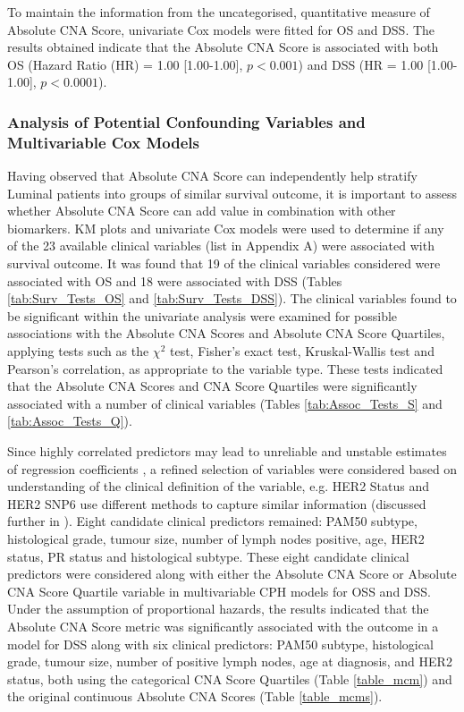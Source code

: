 To maintain the information from the uncategorised, quantitative measure of Absolute CNA Score, univariate Cox models were fitted for OS and DSS. The results obtained indicate that the Absolute CNA Score is associated with both OS (Hazard Ratio (HR) = 1.00 [1.00-1.00], $p < 0.001$) and DSS (HR = 1.00 [1.00-1.00], $p < 0.0001$).

\subsubsection{Analysis of Potential Confounding Variables and Multivariable Cox Models}
Having observed that Absolute CNA Score can independently help stratify Luminal patients into groups of similar survival outcome, it is important to assess whether Absolute CNA Score can add value in combination with other biomarkers. KM plots and univariate Cox models were used to determine if any of the 23 available clinical variables (list in Appendix A) were associated with survival outcome. It was found that 19 of the clinical variables considered were associated with OS and 18 were associated with DSS (Tables \ref{tab:Surv_Tests_OS} and \ref{tab:Surv_Tests_DSS}). The clinical variables found to be significant within the univariate analysis were examined for possible associations with the Absolute CNA Scores and Absolute CNA Score Quartiles, applying tests such as the $\chi^2$ test, Fisher’s exact test, Kruskal-Wallis test and Pearson's correlation, as appropriate to the variable type. These tests indicated that the Absolute CNA Scores and CNA Score Quartiles were significantly associated with a number of clinical variables (Tables \ref{tab:Assoc_Tests_S} and \ref{tab:Assoc_Tests_Q}).

Since highly correlated predictors may lead to unreliable and unstable estimates of regression coefficients \citep{Keith_2019}, a refined selection of variables were considered based on understanding of the clinical definition of the variable, e.g. HER2 Status and HER2 SNP6 use different methods to capture similar information (discussed further in \cite{King_2021}). Eight candidate clinical predictors remained: PAM50 subtype, histological grade, tumour size, number of lymph nodes positive, age, HER2 status, PR status and histological subtype. These eight candidate clinical predictors were considered along with either the Absolute CNA Score or Absolute CNA Score Quartile variable in multivariable CPH models for OSS and DSS. Under the assumption of proportional hazards, the results indicated that the Absolute CNA Score metric was significantly associated with the outcome in a model for DSS along with six clinical predictors: PAM50 subtype, histological grade, tumour size, number of positive lymph nodes, age at diagnosis, and HER2 status, both using the categorical CNA Score Quartiles (Table \ref{table_mcm}) and the original continuous Absolute CNA Scores (Table \ref{table_mcms}). 

